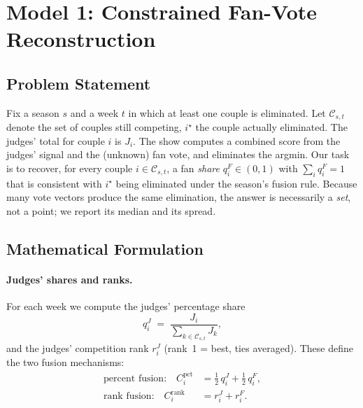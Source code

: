 \documentclass{article}
\begin{document}


\section{Model 1: Constrained Fan-Vote Reconstruction}\label{sec:m1}

\subsection{Problem Statement}

Fix a season $s$ and a week $t$ in which at least one couple is eliminated. Let
$\mathcal{C}_{s,t}$ denote the set of couples still competing, $i^{\star}$ the couple
actually eliminated. The judges' total for couple $i$ is $J_{i}$. The show computes a
combined score from the judges' signal and the (unknown) fan vote, and eliminates the
argmin. Our task is to recover, for every couple $i\in\mathcal{C}_{s,t}$, a fan
\emph{share} $q^{F}_{i}\in(0,1)$ with $\sum_{i}q^{F}_{i}=1$ that is consistent with
$i^{\star}$ being eliminated under the season's fusion rule. Because many vote vectors
produce the same elimination, the answer is necessarily a \emph{set}, not a point; we
report its median and its spread.

\subsection{Mathematical Formulation}

\paragraph{Judges' shares and ranks.} For each week we compute the judges' percentage
share
\begin{equation}
q^{J}_{i} \;=\; \frac{J_{i}}{\sum_{k\in\mathcal{C}_{s,t}} J_{k}},
\end{equation}
and the judges' competition rank $r^{J}_{i}$ (rank~1 = best, ties averaged). These define
the two fusion mechanisms:
\begin{align}
\text{percent fusion:}\quad C^{\text{pct}}_{i} &= \tfrac12\, q^{J}_{i} + \tfrac12\, q^{F}_{i}, \\
\text{rank fusion:}\quad C^{\text{rank}}_{i} &= r^{J}_{i} + r^{F}_{i}.
\end{align}
\end{document}
